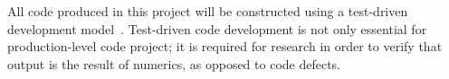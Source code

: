 All code produced in this project will be constructed using a test-driven
development model~\cite{evans_ieee}.  Test-driven code development is not only
essential for production-level code project; it is required for research in
order to verify that output is the result of numerics, as opposed to code
defects.

\pagebreak
\endinput


